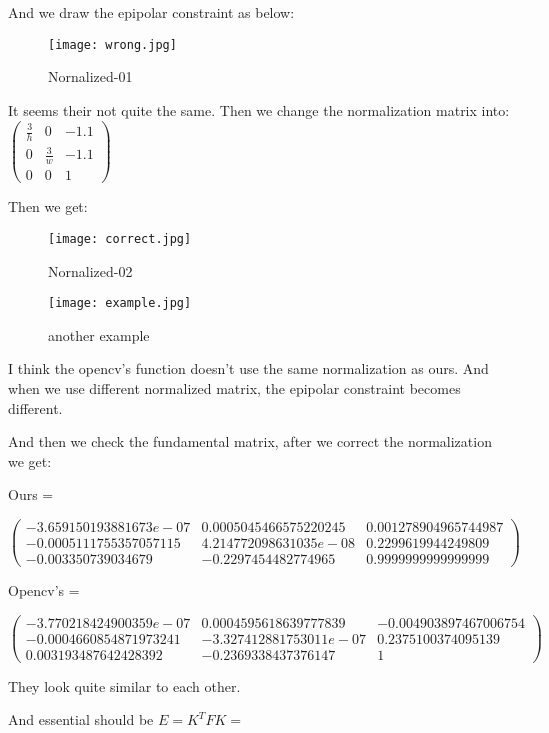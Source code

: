 \documentclass{article}
\begin{document}
And we draw the epipolar constraint as below:

\begin{figure}[h]
	\centering
	\texttt{[image: wrong.jpg]}
	\caption{Nornalized-01}
\end{figure}

It seems their not quite the same. Then we change the normalization matrix into:$\begin{pmatrix}
\frac{3}{h} & 0 & -1.1 \\
0 & \frac{3}{w} & -1.1 \\
0 & 0 & 1
\end{pmatrix}$

Then we get:
\begin{figure}[h]
	\centering
	\texttt{[image: correct.jpg]}
	\caption{Nornalized-02}
\end{figure}

\begin{figure}[h]
	\centering
	\texttt{[image: example.jpg]}
	\caption{another example}
\end{figure}

I think the opencv's function doesn't use the same normalization as ours. And when we use different normalized matrix, the epipolar constraint becomes different. 

And then we check the fundamental matrix, after we correct the normalization we get:

Ours = 

$\begin{pmatrix}
-3.659150193881673e-07 & 0.0005045466575220245& 0.001278904965744987\\
-0.0005111755357057115 & 4.214772098631035e-08& 0.2299619944249809\\
-0.003350739034679 & -0.2297454482774965 &0.9999999999999999
\end{pmatrix}$ 

Opencv's = 

$\begin{pmatrix}
-3.770218424900359e-07& 0.0004595618639777839& -0.004903897467006754\\
-0.0004660854871973241&-3.327412881753011e-07& 0.2375100374095139\\
0.003193487642428392& -0.2369338437376147& 1
\end{pmatrix}$ 

They look quite similar to each other.

And essential should be $E = K^{T}FK = $
\end{document}

